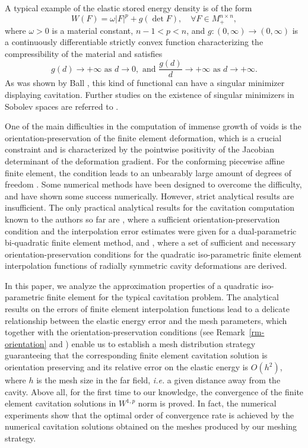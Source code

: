 \documentclass[12pt]{article}
\numberwithin{equation}{section}
\begin{document}
A typical example of the elastic stored energy density is of the form
\begin{equation}
    \label{energy density}
  W(F)=\omega |F|^p+ g(\det F),\quad \forall F \in M^{n\times n}_+,
\end{equation}
where $\omega>0$ is a material constant, $n-1<p<n$,
and $g:(0,\infty)\rightarrow
(0,\infty)$ is a continuously differentiable strictly convex function characterizing
the compressibility of the material and satisfies
\begin{equation}\label{asmp g}
g(d)\rightarrow+\infty\mbox{ as } d \rightarrow 0,\mbox{ and }
\frac{g(d)}{d}\rightarrow+\infty \mbox{ as } d\rightarrow +\infty.
\end{equation}
As was shown by Ball \cite{Ball82}, this kind of functional can have a singular minimizer
displaying cavitation. Further studies on the existence of singular minimizers in
Sobolev spaces are referred to \cite{Henao2009, Muller, Sival2000}.

One of the main difficulties in the computation of immense growth of
voids is the orientation-preservation of the finite element
deformation, which is a crucial constraint and is characterized by the pointwise
positivity of the Jacobian determinant of the deformation gradient.
For the conforming piecewise affine finite element, the condition leads to an
unbearably large amount of degrees of freedom \cite{Xu and
Henao}. Some numerical methods \cite{Lian Dual, Lian and Li
iso, Lian and Li 3, Xu and Henao} have been designed to overcome the difficulty,
and have shown some success numerically. However, strict analytical
results are insufficient. The only practical analytical results for the
cavitation computation known to the authors so far are \cite{SuLiRectan}, where a
sufficient orientation-preservation condition and the interpolation error
estimates were given for a dual-parametric bi-quadratic finite element method,
and \cite{detp}, where a set of sufficient and necessary orientation-preservation
conditions for the quadratic iso-parametric finite element interpolation functions
of radially symmetric cavity deformations are derived.

In this paper, we analyze the approximation properties of
a quadratic iso-parametric finite element for the typical cavitation problem.
The analytical results on the errors of finite element interpolation functions
lead to a delicate relationship between the elastic energy error and the mesh
parameters, which together with the orientation-preservation conditions
(see Remark~\ref{rm-orientation} and \cite{detp})
enable us to establish a mesh distribution strategy guaranteeing that
the corresponding finite element cavitation solution is orientation preserving
and its relative error on the elastic energy is $O(h^2)$, where $h$ is
the mesh size in the far field, {\em i.e.} a given distance away from the cavity.
Above all, for the first time to our knowledge, the convergence of the
finite element cavitation solutions in $W^{1,p}$ norm is proved. In fact, the
numerical experiments show that the optimal order of convergence rate is achieved
by the numerical cavitation solutions obtained on the meshes produced by our
meshing strategy.
\end{document}
